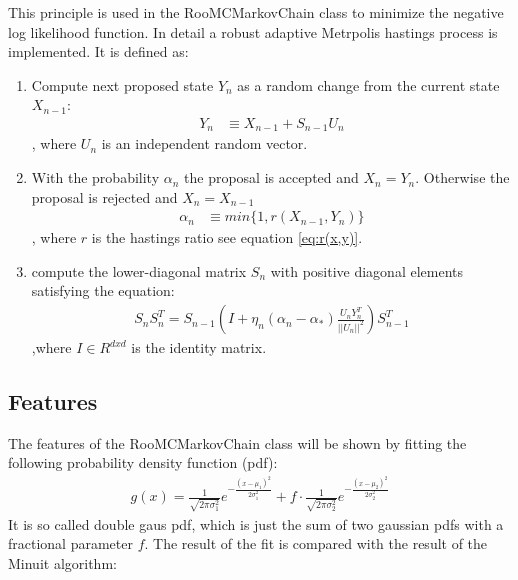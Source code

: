 \documentclass[english]{uzhpub}
\begin{document}
This principle is used in the RooMCMarkovChain class to minimize the negative log likelihood function. In detail a robust adaptive Metrpolis hastings process is implemented. It is defined as:
\begin{enumerate}
  \item  Compute next proposed state $Y_n$ as a random change from the current state $X_{n-1}$:
  \begin{align*}   Y_n &\equiv X_{n-1} + S_{n-1} U_n    \end{align*}
  , where $U_n$ is an independent random vector.
  \item With the probability $\alpha_n$ the proposal is accepted and $X_n = Y_n$. Otherwise the proposal is rejected and $X_n = X_{n-1}$
  \begin{align*}  \alpha_n &\equiv min\{ 1, r(X_{n-1},Y_n) \} \end{align*}
  , where $r$ is the hastings ratio see equation \ref{eq:r(x,y)}.
  \item compute the lower-diagonal matrix $S_n$ with positive diagonal elements satisfying the equation:
  \begin{align}
    S_n S_n^T = S_{n-1} \left( I + \eta_n(\alpha_n - \alpha_*) \frac{U_n Y_n^T}{||U_n||^2} \right) S_{n-1}^T
  \end{align}
  ,where $I \in R^{dxd}$ is the identity matrix.
\end{enumerate}



\subsection{Features}
 The features of the RooMCMarkovChain class will be shown by fitting the following probability density function (pdf):
\begin{align}
  g(x) = \frac{1}{\sqrt{2 \pi \sigma_1^2}} e^{- \frac{(x-\mu_1)^2}{2 \sigma_1^2}} + f \cdot  \frac{1}{\sqrt{2 \pi \sigma_2^2}} e^{- \frac{(x-\mu_2)^2}{2 \sigma_2^2}} \label{eq:gausspdf}
 \end{align}
It is so called double gaus pdf, which is just the sum of two gaussian pdfs with a fractional parameter $f$.
The result of the fit is compared with the result of the Minuit algorithm:
\end{document}
